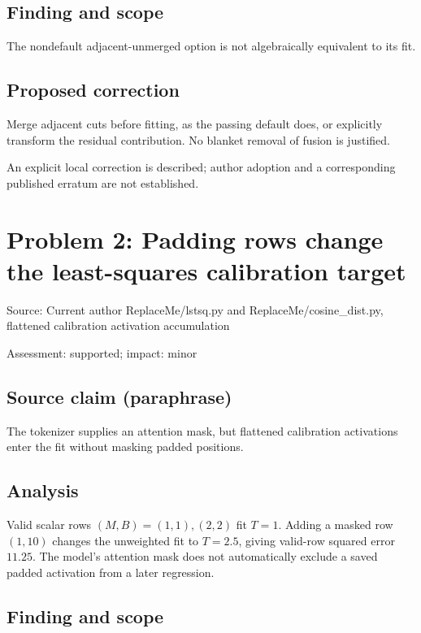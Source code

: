 \documentclass[11pt]{article}
\begin{document}
\subsection*{Finding and scope}

The nondefault adjacent-unmerged option is not algebraically equivalent to its fit.

\subsection*{Proposed correction}

Merge adjacent cuts before fitting, as the passing default does, or explicitly transform the residual contribution. No blanket removal of fusion is justified.

An explicit local correction is described; author adoption and a corresponding published erratum are not established.

\section*{Problem 2: Padding rows change the least-squares calibration target}

Source: Current author ReplaceMe/lstsq.py and ReplaceMe/cosine\_dist.py, flattened calibration activation accumulation

Assessment: supported; impact: minor

\subsection*{Source claim (paraphrase)}

The tokenizer supplies an attention mask, but flattened calibration activations enter the fit without masking padded positions.

\subsection*{Analysis}

Valid scalar rows \((M,B)=(1,1),(2,2)\) fit \(T=1\). Adding a masked row \((1,10)\) changes the unweighted fit to \(T=2.5\), giving valid-row squared error \(11.25\). The model’s attention mask does not automatically exclude a saved padded activation from a later regression.

\subsection*{Finding and scope}
\end{document}
